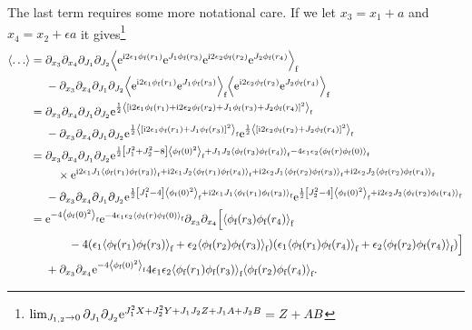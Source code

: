 \documentclass[english, parskip=full]{scrartcl}
\begin{document}
The last term requires some more notational care.
If we let $x_3=x_1+a$ and $x_4=x_2+\epsilon a$ it gives\footnote{$\lim_{J_{1,2}\rightarrow 0} \partial_{J_1} \partial_{J_2} \text{e}^{J_1^2 X + J_2^2Y + J_1J_2Z + J_1A + J_2B} = Z + AB$}
\begin{align}
\bra*{\dots} &= \bsplit{ & \partial_{x_3} \partial_{x_4} \partial_{J_1} \partial_{J_2} \bra*{\powe{\i 2\epsilon_1 \phi_\f(r_1)} \powe{J_1 \phi_\f(r_3)} \powe{\i 2\epsilon_2 \phi_\f(r_2)} \powe{J_2 \phi_\f(r_4)}}_\f\\
& - \partial_{x_3} \partial_{x_4} \partial_{J_1} \partial_{J_2} \bra*{\powe{\i 2\epsilon_1 \phi_\f(r_1)} \powe{J_1 \phi_\f(r_3)}}_\f \bra*{\powe{\i 2\epsilon_2 \phi_\f(r_2)} \powe{J_2 \phi_\f(r_4)}}_\f }\\
&= \bsplit{ & \partial_{x_3} \partial_{x_4} \partial_{J_1} \partial_{J_2} \powe{\frac{1}{2} \bra*{\klb*{\i 2\epsilon_1\phi_\f(r_1) + \i 2\epsilon_2\phi_\f(r_2) + J_1 \phi_\f(r_3) + J_2 \phi_\f(r_4)}^2}_\f }\\
& - \partial_{x_3} \partial_{x_4} \partial_{J_1} \partial_{J_2} \powe{\frac{1}{2} \bra*{\klb*{\i 2\epsilon_1\phi_\f(r_1) + J_1 \phi_\f(r_3)}^2}_\f } \powe{\frac{1}{2} \bra*{\klb*{\i 2\epsilon_2\phi_\f(r_2) + J_2 \phi_\f(r_4)}^2}_\f }}\\
&= \bsplit{ & \partial_{x_3} \partial_{x_4} \partial_{J_1} \partial_{J_2} \powe{\frac{1}{2} \klb*{J_1^2 + J_2^2 - 8} \bra*{\phi_\f(0)^2}_\f + J_1J_2 \bra*{\phi_\f(r_3) \phi_\f(r_4)}_\f - 4\epsilon_1\epsilon_2 \bra*{\phi_\f(r) \phi_\f(0)}_\f}\\
&\quad \times \powe{\i 2 \epsilon_1 J_1 \bra*{\phi_\f(r_1) \phi_\f(r_3)}_\f + \i 2 \epsilon_1 J_2 \bra*{\phi_\f(r_1) \phi_\f(r_4)}_\f + \i 2 \epsilon_2 J_1 \bra*{\phi_\f(r_2) \phi_\f(r_3)}_\f + \i 2 \epsilon_2 J_2 \bra*{\phi_\f(r_2) \phi_\f(r_4)}_\f }\\
& - \partial_{x_3} \partial_{x_4} \partial_{J_1} \partial_{J_2} \powe{\frac{1}{2} \klb*{J_1^2 - 4}\bra*{\phi_\f(0)^2}_\f + \i 2\epsilon_1J_1 \bra*{\phi_\f(r_1) \phi_\f(r_3)}_\f } \powe{\frac{1}{2} \klb*{J_2^2 - 4} \bra*{\phi_\f(0)^2}_\f + \i 2\epsilon_2J_2 \bra*{\phi_\f(r_2)\phi_\f(r_4)}_\f }}\\
&=  \bsplit{ &\powe{-4 \bra*{\phi_\f(0)^2}_\f }\powe{-4\epsilon_1\epsilon_2 \bra*{\phi_\f(r) \phi_\f(0)}_\f} \partial_{x_3} \partial_{x_4} \klb[\Big]{\bra*{\phi_\f(r_3) \phi_\f(r_4)}_\f \\
&\qquad - 4 \kla*{\epsilon_1 \bra*{\phi_\f(r_1) \phi_\f(r_3)}_\f + \epsilon_2\bra*{\phi_\f(r_2) \phi_\f(r_3)}_\f} \kla*{\epsilon_1 \bra*{\phi_\f(r_1) \phi_\f(r_4)}_\f + \epsilon_2\bra*{\phi_\f(r_2) \phi_\f(r_4)}_\f} }\\
& + \partial_{x_3} \partial_{x_4} \powe{-4\bra*{\phi_\f(0)^2}_\f} 4\epsilon_1\epsilon_2 \bra*{\phi_\f(r_1) \phi_\f(r_3)}_\f \bra*{\phi_\f(r_2) \phi_\f(r_4)}_\f.}
\end{align}
\end{document}
